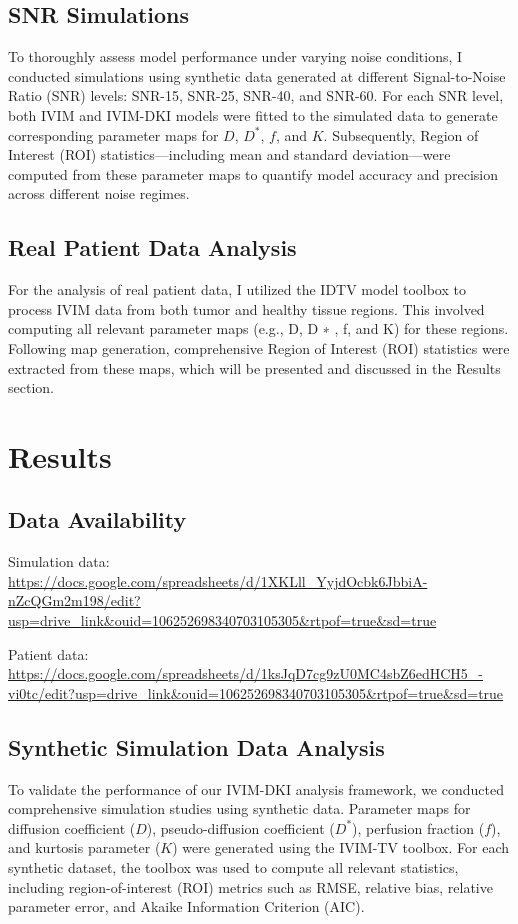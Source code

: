\documentclass[a4paper,12pt]{article}
\begin{document}
\subsection{SNR Simulations}
To thoroughly assess model performance under varying noise conditions, I conducted simulations using synthetic data generated at different Signal-to-Noise Ratio (SNR) levels: SNR-15, SNR-25, SNR-40, and SNR-60. For each SNR level, both IVIM and IVIM-DKI models were fitted to the simulated data to generate corresponding parameter maps for $D$, $D^*$, $f$, and $K$. Subsequently, Region of Interest (ROI) statistics—including mean and standard deviation—were computed from these parameter maps to quantify model accuracy and precision across different noise regimes.

\subsection{Real Patient Data Analysis}
For the analysis of real patient data, I utilized the IDTV model toolbox to process IVIM data from both tumor and healthy tissue regions. This involved computing all relevant parameter maps (e.g., D, D 
∗
 , f, and K) for these regions. Following map generation, comprehensive Region of Interest (ROI) statistics were extracted from these maps, which will be presented and discussed in the Results section.
\section{Results}

\subsection*{Data Availability}
Simulation data: \url{https://docs.google.com/spreadsheets/d/1XKLll_YyjdOcbk6JbbiA-nZcQGm2m198/edit?usp=drive_link&ouid=106252698340703105305&rtpof=true&sd=true}

Patient data: \url{https://docs.google.com/spreadsheets/d/1ksJqD7cg9zU0MC4sbZ6edHCH5_-vi0tc/edit?usp=drive_link&ouid=106252698340703105305&rtpof=true&sd=true}

\subsection{Synthetic Simulation Data Analysis}

To validate the performance of our IVIM-DKI analysis framework, we conducted comprehensive simulation studies using synthetic data. Parameter maps for diffusion coefficient ($D$), pseudo-diffusion coefficient ($D^*$), perfusion fraction ($f$), and kurtosis parameter ($K$) were generated using the IVIM-TV toolbox. For each synthetic dataset, the toolbox was used to compute all relevant statistics, including region-of-interest (ROI) metrics such as RMSE, relative bias, relative parameter error, and Akaike Information Criterion (AIC).
\end{document}
